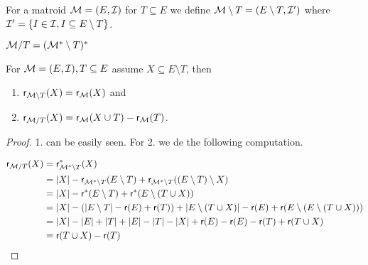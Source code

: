 \begin{defn}[Deletion]
	For a matroid $\mathcal{M} = (E, \mathcal{I})$ for $T \subseteq E$ we define $\mathcal{M} \setminus T = (E \setminus T, \mathcal{I}')$ where $\mathcal{I}' = \{I \in \mathcal{I}, I \subseteq E \setminus T\}$.
\end{defn}

\begin{defn}[Contraction]
	$\mathcal{M} / T = (\mathcal{M}^{\ast} \setminus T)^{\ast}$
\end{defn}

\begin{prop}
	For $\mathcal{M} = (E, \mathcal{I}), T \subseteq E$ assume $X \subseteq E \setminus T$, then
	
	\begin{enumerate}
		\item $\operatorname{\textsf{r}}_{\mathcal{M} \setminus T} (X) = \operatorname{\textsf{r}}_{\mathcal{M}} (X)$ and
		\item $\operatorname{\textsf{r}}_{\mathcal{M} / T}(X) = \operatorname{\textsf{r}}_{\mathcal{M}}(X \cup T) - \operatorname{\textsf{r}}_{\mathcal{M}}(T)$.
	\end{enumerate}
\end{prop}

\begin{proof}
	1. can be easily seen. For 2. we de the following computation.
	
	$$
	\begin{aligned}
		\operatorname{\textsf{r}}_{\mathcal{M} / T} (X) &= \operatorname{\textsf{r}}_{\mathcal{M}^{\ast} \setminus T}^{\ast} (X) \\
		&= |X| - \operatorname{\textsf{r}}_{\mathcal{M}^{\ast} \setminus T} (E \setminus T) + \operatorname{\textsf{r}}_{\mathcal{M}^{\ast} \setminus T} ((E \setminus T) \setminus X)\\
		&= |X| - \operatorname{\textsf{r}}^{\ast}(E \setminus T) + \operatorname{\textsf{r}}^{\ast}(E \setminus (T \cup X)) \\
		&= |X| - (|E \setminus T| - \operatorname{\textsf{r}}(E) + \operatorname{\textsf{r}}(T)) + |E \setminus (T \cup X)| - \operatorname{\textsf{r}}(E) + \operatorname{\textsf{r}}(E \setminus (E \setminus (T \cup X))) \\
		&= |X| - |E| + |T| + |E| - |T| - |X| + \operatorname{\textsf{r}}(E) - \operatorname{\textsf{r}}(E) - \operatorname{\textsf{r}}(T) + \operatorname{\textsf{r}}(T \cup X)\\
		&=\operatorname{\textsf{r}}(T \cup X) - \operatorname{\textsf{r}}(T)
	\end{aligned}
	$$
\end{proof}